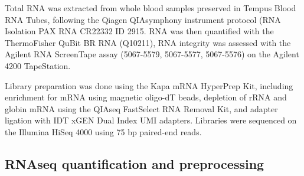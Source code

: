 \begin{outline}
%

Total RNA was extracted from whole blood samples preserved in Tempus Blood RNA Tubes, following the Qiagen QIAsymphony instrument protocol (RNA Isolation PAX RNA CR22332 ID 2915.
RNA was then quantified with the ThermoFisher QuBit BR RNA (Q10211), RNA integrity was assessed with the Agilent RNA ScreenTape assay (5067-5579, 5067-5577, 5067-5576) on the Agilent 4200 TapeStation.

Library preparation was done using the Kapa mRNA HyperPrep Kit, including enrichment for mRNA using magnetic oligo-dT beads, depletion of rRNA and globin mRNA using the QIAseq FastSelect RNA Removal Kit, and adapter ligation with IDT xGEN Dual Index UMI adapters.
Libraries were sequenced on the Illumina HiSeq 4000 using 75 bp paired-end reads.

\subsection{RNAseq quantification and preprocessing}


\end{outline}
